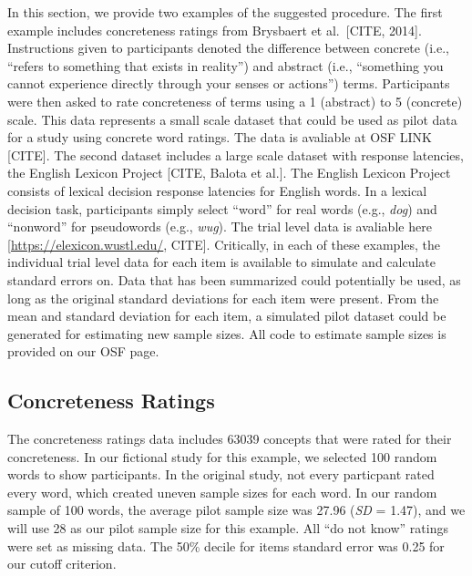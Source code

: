 \documentclass[
  man]{apa6}
\begin{document}
In this section, we provide two examples of the suggested procedure. The first example includes concreteness ratings from Brysbaert et al.~{[}CITE, 2014{]}. Instructions given to participants denoted the difference between concrete (i.e., ``refers to something that exists in reality'') and abstract (i.e., ``something you cannot experience directly through your senses or actions'') terms. Participants were then asked to rate concreteness of terms using a 1 (abstract) to 5 (concrete) scale. This data represents a small scale dataset that could be used as pilot data for a study using concrete word ratings. The data is avaliable at OSF LINK {[}CITE{]}. The second dataset includes a large scale dataset with response latencies, the English Lexicon Project {[}CITE, Balota et al.{]}. The English Lexicon Project consists of lexical decision response latencies for English words. In a lexical decision task, participants simply select ``word'' for real words (e.g., \emph{dog}) and ``nonword'' for pseudowords (e.g., \emph{wug}). The trial level data is avaliable here {[}\url{https://elexicon.wustl.edu/}, CITE{]}. Critically, in each of these examples, the individual trial level data for each item is available to simulate and calculate standard errors on. Data that has been summarized could potentially be used, as long as the original standard deviations for each item were present. From the mean and standard deviation for each item, a simulated pilot dataset could be generated for estimating new sample sizes. All code to estimate sample sizes is provided on our OSF page.

\hypertarget{concreteness-ratings}{%
\subsection{Concreteness Ratings}\label{concreteness-ratings}}

The concreteness ratings data includes 63039 concepts that were rated for their concreteness. In our fictional study for this example, we selected 100 random words to show participants. In the original study, not every particpant rated every word, which created uneven sample sizes for each word. In our random sample of 100 words, the average pilot sample size was 27.96 (\emph{SD} = 1.47), and we will use 28 as our pilot sample size for this example. All ``do not know'' ratings were set as missing data. The 50\% decile for items standard error was 0.25 for our cutoff criterion.
\end{document}
